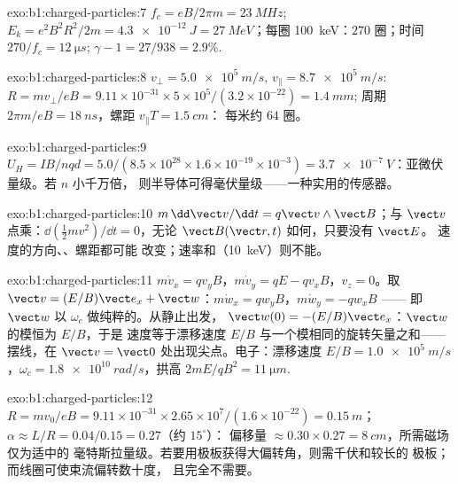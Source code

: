 \begin{solution}{exo:b1:charged-particles:7}
$f_c = eB/2\pi m = \qty{23}{MHz}$; $E_k = e^2B^2R^2/2m = \qty{4.3e-12}{J} =
\qty{27}{MeV}$；每圈 \qty{100}{keV}：$270$ 圈；时间 $270/f_c =
\qty{12}{\micro s}$; $\gamma - 1 = 27/938 = 2.9\%$.
\end{solution}

\begin{solution}{exo:b1:charged-particles:8}
$v_\perp = \qty{5.0e5}{m/s}$, $v_\parallel = \qty{8.7e5}{m/s}$: $R = mv_\perp/eB
= 9.11\times10^{-31} \times 5\times10^5/(3.2\times10^{-22}) = \qty{1.4}{mm}$;
周期 $2\pi m/eB = \qty{18}{ns}$，螺距 $v_\parallel T = \qty{1.5}{cm}$：
每米约 $64$ 圈。
\end{solution}

\begin{solution}{exo:b1:charged-particles:9}
$U_H = IB/nqd = 5.0/(8.5\times10^{28} \times 1.6\times10^{-19} \times 10^{-3})
= \qty{3.7e-7}{V}$：亚微伏量级。若 $n$ 小千万倍，
则半导体可得毫伏量级——一种实用的传感器。
\end{solution}

\begin{solution}{exo:b1:charged-particles:10}
$m\,\dd\vect v/\dd t = q\vect v\wedge\vect B$；与 $\vect v$ 点乘：$\dd(\tfrac12 mv^2)/
\dd t = 0$，无论 $\vect B(\vect r, t)$ 如何，只要没有 $\vect E$。
速度的方向、、螺距都可能
改变；速率和（\qty{10}{keV}）则不能。
\end{solution}

\begin{solution}{exo:b1:charged-particles:11}
$m\dot v_x = qv_yB$，$m\dot v_y = qE - qv_xB$，$v_z = 0$。取 $\vect v =
(E/B)\vect e_x + \vect w$：$m\dot w_x = qw_yB$，$m\dot w_y = -qw_xB$ ——
即 $\vect w$ 以 $\omega_c$ 做纯粹的。从静止出发，
$\vect w(0) = -(E/B)\vect e_x$：$\vect w$ 的模恒为 $E/B$，于是
速度等于漂移速度 $E/B$ 与一个模相同的旋转矢量之和——
摆线，在 $\vect v = \vect 0$ 处出现尖点。电子：漂移速度 $E/B =
\qty{1.0e5}{m/s}$，$\omega_c = \qty{1.8e10}{rad/s}$，拱高 $2mE/qB^2 =
\qty{11}{\micro m}$.
\end{solution}

\begin{solution}{exo:b1:charged-particles:12}
$R = mv_0/eB = 9.11\times10^{-31} \times 2.65\times10^7/(1.6\times10^{-22}) =
\qty{0.15}{m}$；$\alpha \approx L/R = 0.04/0.15 = 0.27$（约 $15^\circ$）：
偏移量 $\approx 0.30 \times 0.27 = \qty{8}{cm}$，所需磁场仅为适中的
毫特斯拉量级。若要用极板获得大偏转角，则需千伏和较长的
极板；而线圈可使束流偏转数十度，
且完全不需要。
\end{solution}

